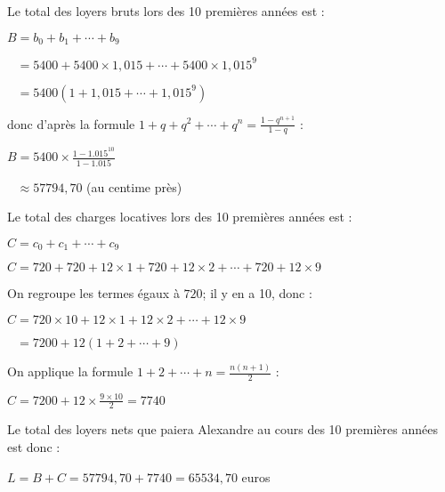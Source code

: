 \begin{corrige}
\begin{enumerate}
          Le total des loyers bruts lors des 10 premières années est :
          \par
          $B=b_0+b_1+ \cdots +b_9$
          \par
          $\phantom{B}=5400+5400 \times 1,015 + \cdots +5400 \times 1,015^9$
          \par
          $\phantom{B}=5400(1+1,015 + \cdots +1,015^9)$
          \par
          donc d'après la formule $1+q+q^2+\cdots+q^n= \frac{1-q^{n+1}}{1-q} $ :
          \par
          $B=5400 \times  \frac{1-1.015^{10}}{1-1.015} $
          \par
          $\phantom{B} \approx 57794,70$ (au centime près)
          \par
          Le total des charges locatives lors des 10 premières années est :
          \par
          $C=c_0+c_1+ \cdots +c_9$
          \par
          $C=720+ 720+12 \times 1+ 720+12 \times 2  +$$ \cdots  +720+12 \times 9$
          \par
          On regroupe les termes égaux à $720$; il y en a 10, donc :
          \par
          $C=720\times 10+12 \times 1+12 \times 2  + \cdots +12 \times 9$
          \par
          $\phantom{C}=7200+12 (1+2+\cdots +9)$
          \par
          On applique la formule $1+2+\cdots +n= \frac{n(n+1)}{2} $ :
          \par
          $C=7200+12\times  \frac{9\times 10}{2} = 7740$
          \par
          Le total des loyers nets que paiera Alexandre au cours des 10 premières années est donc :
          \par
          $L=B+C=57794,70+7740=65534,70$ euros
     \end{enumerate}
\end{corrige}
